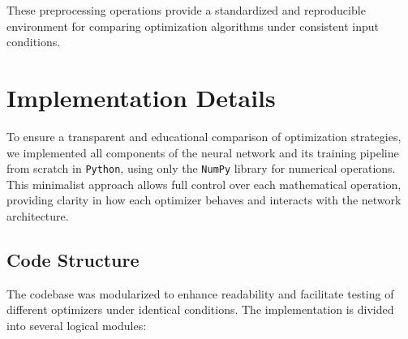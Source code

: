 \documentclass[12pt]{article}
\begin{document}
These preprocessing operations provide a standardized and reproducible environment for comparing optimization algorithms under consistent input conditions.

 \section{Implementation Details}

To ensure a transparent and educational comparison of optimization strategies, we implemented all components of the neural network and its training pipeline from scratch in \texttt{Python}, using only the \texttt{NumPy} library for numerical operations. This minimalist approach allows full control over each mathematical operation, providing clarity in how each optimizer behaves and interacts with the network architecture.

\subsection{Code Structure}

The codebase was modularized to enhance readability and facilitate testing of different optimizers under identical conditions. The implementation is divided into several logical modules:
\end{document}
